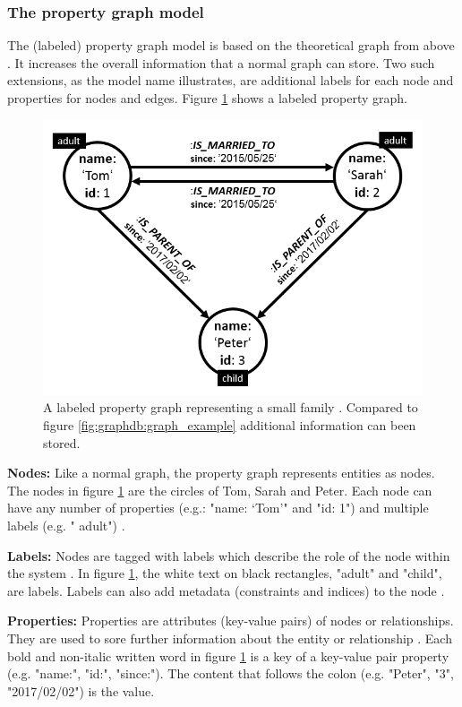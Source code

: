 \subsubsection{The property graph model}
The (labeled) property graph model is based on the theoretical graph from above \autocite{maheshlal2015}. It increases the overall information that a normal graph can store. Two such extensions, as the model name illustrates, are additional labels for each node and properties for nodes and edges. Figure \ref{fig:graphdb:property_graph_example} shows a labeled property graph.

\begin{figure}[ht]
    \centering
    \includegraphics[width=.5\textwidth]{img/property_graph_example.PNG}
    \caption{A labeled property graph representing a small family \autocite{maheshlal2015, graphdb2015}. Compared to figure \ref{fig:graphdb:graph_example} additional information can been stored.}
    \label{fig:graphdb:property_graph_example}
\end{figure}


\textbf{Nodes:} Like a normal graph, the property graph represents entities as nodes. The nodes in figure \ref{fig:graphdb:property_graph_example} are the circles of Tom, Sarah and Peter. Each node can have any number of properties (e.g.: "name: ‘Tom’" and  "id: 1") and multiple labels (e.g. " adult") \autocite{neo4j:graphdb}.

\textbf{Labels:} Nodes are tagged with labels which describe the role of the node within the system \autocite{maheshlal2015}. In figure \ref{fig:graphdb:property_graph_example}, the white text on black rectangles, "adult" and "child", are labels. Labels can also add metadata (constraints and indices) to the node \autocite{maheshlal2015, neo4j:graphdb}.

\textbf{Properties:} Properties are attributes (key-value pairs) of nodes or relationships. They are used to sore further information about the entity or relationship \autocite{maheshlal2015}. Each bold and non-italic written word in figure \ref{fig:graphdb:property_graph_example} is a key of a key-value pair property (e.g. "name:", "id:", "since:"). The content that follows the colon (e.g. "Peter", "3", "2017/02/02") is the value.

